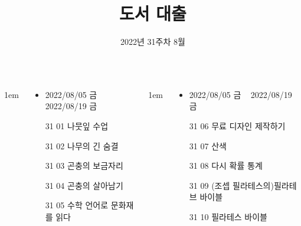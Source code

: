 \documentclass[	20pt, 
							a1paper, 
							portrait, %
							margin=0mm, %
							innermargin=10mm,  		%
							colspace=5mm, 
							subcolspace=0mm
							]{tikzposter}
\title{도서 대출}
\author{ 2022년 31주차 8월  }
\begin{document}
	\maketitle

	\begin{columns}


			{
					\setlength{\leftmargini}{4em}
					\setlength{\labelsep} {1em}
				\begin{LARGE}
					\begin{itemize}
					\item 	2022/08/05 금 ~ 2022/08/19 금
					\item 	[31 01]  나뭇잎 수업
					\item 	[31 02]  나무의 긴 숨결
					\item 	[31 03]  곤충의 보금자리
					\item 	[31 04]  곤충의 살아남기
					\item 	[31 05]  수학 언어로 문화재를 읽다
					\end{itemize}
				\end{LARGE}
			}






			{
					\setlength{\leftmargini}{4em}
					\setlength{\labelsep} {1em}
				\begin{LARGE}
					\begin{itemize}
					\item 	2022/08/05 금 ~ 2022/08/19 금
					\item 	[31 06]  무료 디자인 제작하기
					\item 	[31 07]  산색
					\item 	[31 08]  다시  확률 통계
					\item 	[31 09]  (조셉 필라테스의)필라테브 바이블
					\item 	[31 10] 필라테스 바이블  
					\end{itemize}
				\end{LARGE}
			}


\end{columns}
\end{document}
